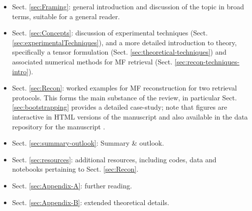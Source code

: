 \documentclass[10pt]{article}
\begin{document}
\begin{itemize}
\item Sect. \ref{sec:Framing}: general introduction and discussion of the topic in broad terms, suitable for a general reader.
\item Sect. \ref{sec:Concepts}: discussion of experimental techniques (Sect. \ref{sec:experimentalTechniques}), and a more detailed introduction to theory, specifically a tensor formulation  (Sect. \ref{sec:theoretical-techniques}) and associated numerical methods for MF retrieval (Sect. \ref{sec:recon-techniques-intro}).
\item Sect. \ref{sec:Recon}: worked examples for MF reconstruction for two retrieval protocols. This forms the main substance of the review, in particular Sect. \ref{sec:bootstrapping} provides a detailed case-study; note that figures are interactive in HTML versions of the manuscript and also available in the data repository for the manuscript \cite{hockett2022MFreconFigshare}.
\item Sect. \ref{sec:summary-outlook}: Summary \& outlook.
\item Sect. \ref{sec:resources}: additional resources, including codes, data and notebooks pertaining to Sect. \ref{sec:Recon}.
\item Sect. \ref{sec:Appendix-A}: further reading.
\item Sect. \ref{sec:Appendix-B}: extended theoretical details.
\end{itemize}


\end{document}
